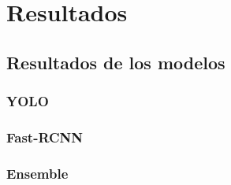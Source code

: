 \documentclass[12pt,a4paper,onecolumn,oneside]{report}
\begin{document}

\chapter{Resultados}
\label{Resultados}

\section{Resultados de los modelos}
\subsection{YOLO}
\subsection{Fast-RCNN}
\subsection{Ensemble}
\end{document}

